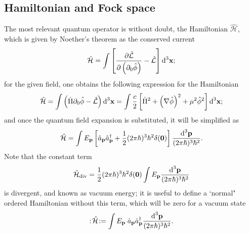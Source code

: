\subsection*{Hamiltonian and Fock space}
The most relevant quantum operator is without doubt, the Hamiltonian $\hat{\mathcal{H}}$, which is given by Noether's theorem as the conserved current
\begin{equation}
	\hat{\mathcal{H}}=\int\left[\frac{\partial\hat{\mathcal{L}}}{\partial\left(\partial_0\hat{\phi}\right)}-\hat{\mathcal{L}}\right]\text{d}^3\mathbf{x};
\end{equation}
for the given field, one obtains the following expression for the Hamiltonian
\begin{equation}
	\hat{\mathcal{H}}=\int\left(\hat{\Pi}\partial_{0}\hat{\phi}-\hat{\mathcal{L}}\right)\text{d}^3\mathbf{x}=\int\frac{c}{2}\left[\hat{\Pi}^2+\left(\mathbf{\nabla}\hat{\phi}\right)^2+\mu^2\hat{\phi}^2\right]\text{d}^3\mathbf{x};
\end{equation}
and once the quantum field expansion is substituted, it will be simplified as
\begin{equation}
	\hat{\mathcal{H}}=\int E_\mathbf{p}\left[\hat{a}_\mathbf{p}\hat{a}_\mathbf{p}^\dagger+\frac{1}{2}(2\pi\hbar)^3\hbar^2\delta(\mathbf{0})\right]\frac{\text{d}^3\mathbf{p}}{(2\pi\hbar)^3\hbar^2}.
\end{equation}
Note that the constant term
\begin{equation}
	\hat{\mathcal{H}}_{\text{div}}=\frac{1}{2}(2\pi\hbar)^3\hbar^2\delta(\mathbf{0})\int E_\mathbf{p}\frac{\text{d}^3\mathbf{p}}{(2\pi\hbar)^3\hbar^2}
\end{equation}
is divergent, and known as vacuum energy; it is useful to define a `normal" ordered Hamiltonian without this term, which will be zero for a vacuum state
\begin{equation}
	:\!\hat{\mathcal{H}}\!:=\int E_\mathbf{p}\;\hat{a}_\mathbf{p}\hat{a}_\mathbf{p}^\dagger\frac{\text{d}^3\mathbf{p}}{(2\pi\hbar)^3\hbar^2}.
\end{equation}


